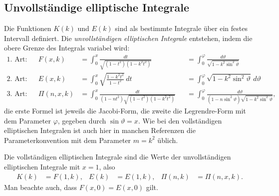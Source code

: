 \subsection{Unvollständige elliptische Integrale
\label{buch:elliptisch:subsection:unvollstintegral}}
Die Funktionen $K(k)$ und $E(k)$ sind als bestimmte Integrale über ein
festes Intervall definiert.
Die {\em unvollständigen elliptischen Integrale} entstehen, indem die
%
obere Grenze des Integrals variabel wird:
\[
\begin{aligned}
\text{1.~Art:}&&
F(x,k)
&=
\int_0^x \frac{dt}{\sqrt{(1-t^2)(1-k^2t^2)}}
&&=
\int_0^\varphi \frac{d\vartheta}{\sqrt{1-k^2\sin^2\vartheta}}
\\
\text{2.~Art:}&&
E(x,k)
&=
\int_0^x \sqrt{\frac{1-k^2t^2}{1-t^2}}\,dt
&&=
\int_0^\varphi \sqrt{1-k^2\sin^2\vartheta}\,d\vartheta
\\
\text{3.~Art:}&&
\Pi(n,x,k)
&=
\int_0^x \frac{dt}{(1-nt^2)\sqrt{(1-t^2)(1-k^2t^2)}}
&&=
\int_0^\varphi
\frac{d\vartheta}{(1-n\sin^2\vartheta)\sqrt{1-k^2\sin^2\vartheta}},
\end{aligned}
\]
die erste Formel ist jeweils die Jacobi-Form, die zweite die Legrendre-Form
%
%
mit dem Parameter $\varphi$, gegeben durch
$\sin \vartheta=x$.
Wie bei den vollständigen elliptischen Integralen ist auch hier in manchen
Referenzen die Parameterkonvention mit dem Parameter $m=k^2$ üblich.

Die vollständigen elliptischen Integrale sind die Werte der 
unvollständigen elliptischen Integrale mit $x=1$, also
\begin{align*}
K(k) &= F(1,k),
&
E(k) &= E(1,k),
&
\Pi(n,k) &=\Pi(n,x,k).
\end{align*}
Man beachte auch, dass $F(x,0) = E(x,0)$ gilt.

